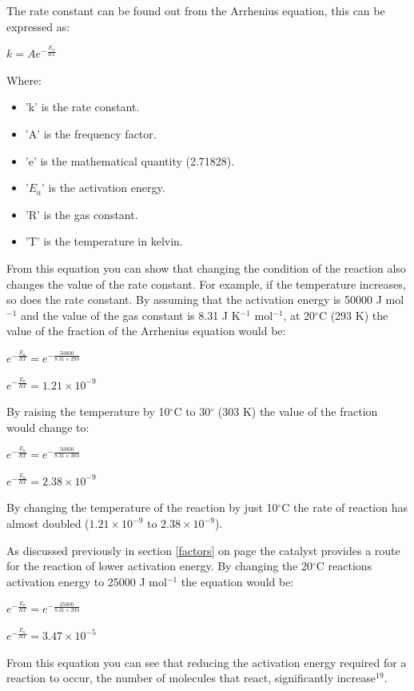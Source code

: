 The rate constant can be found out from the Arrhenius equation, this can be expressed as:

$k = Ae^{-\frac{E_a}{RT}}$

Where:
\begin{itemize}
\item 'k' is the rate constant.
\item 'A' is the frequency factor.
\item 'e' is the mathematical quantity (2.71828).
\item '$E_a$' is the activation energy.
\item 'R' is the gas constant.
\item 'T' is the temperature in kelvin.
\end{itemize}

From this equation you can show that changing the condition of the reaction also changes the value of the rate constant. For example, if the temperature increases, so does the rate constant. By assuming that the activation energy is 50000 J mol$^{-1}$ and the value of the gas constant is 8.31 J K$^{-1}$ mol$^{-1}$, at 20$^{\circ}$C (293 K) the value of the fraction of the Arrhenius equation would be:

$e^{-\frac{E_a}{RT}} = e^{-\frac{50000}{8.31 \times 293}}$

$e^{-\frac{E_a}{RT}} = 1.21 \times 10^{-9}$

By raising the temperature by 10$^{\circ}$C to 30$^{\circ}$ (303 K) the value of the fraction would change to:

$e^{-\frac{E_a}{RT}} = e^{-\frac{50000}{8.31 \times 303}}$

$e^{-\frac{E_a}{RT}} = 2.38 \times 10^{-9}$

By changing the temperature of the reaction by just 10$^{\circ}$C the rate of reaction has almost doubled ($1.21 \times 10^{-9}$ to $2.38 \times 10^{-9}$).

As discussed previously in section \ref{factors} on page \pageref{factors} the catalyst provides a route for the reaction of lower activation energy. By changing the 20$^{\circ}$C reactions activation energy to 25000 J mol$^{-1}$ the equation would be:

$e^{-\frac{E_a}{RT}} = e^{-\frac{25000}{8.31 \times 293}}$

$e^{-\frac{E_a}{RT}} = 3.47 \times 10^{-5}$

From this equation you can see that reducing the activation energy required for a reaction to occur, the number of molecules that react, significantly increase$^{19}$.


